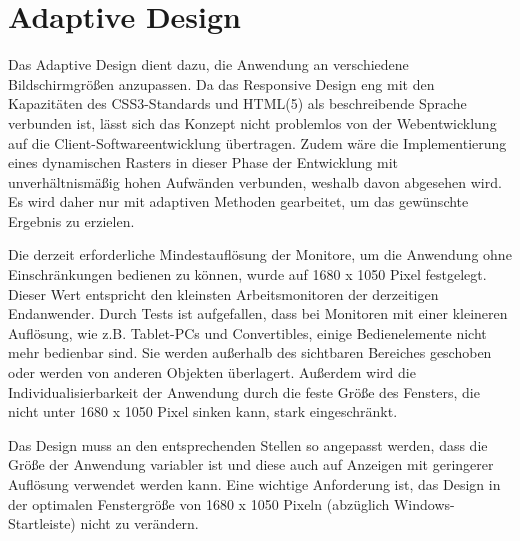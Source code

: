 \chapter{Adaptive Design}
Das Adaptive Design dient dazu, die Anwendung an verschiedene Bildschirmgrößen anzupassen. Da das Responsive Design eng mit den Kapazitäten des CSS3-Standards und HTML(5) als beschreibende Sprache verbunden ist, lässt sich das Konzept nicht problemlos von der Webentwicklung auf die Client-Softwareentwicklung übertragen. Zudem wäre die Implementierung eines dynamischen Rasters in dieser Phase der Entwicklung mit unverhältnismäßig hohen Aufwänden verbunden, weshalb davon abgesehen wird. Es wird daher nur mit adaptiven Methoden gearbeitet, um das gewünschte Ergebnis zu erzielen.\par
Die derzeit erforderliche Mindestauflösung der Monitore, um die Anwendung ohne Einschränkungen bedienen zu können, wurde auf 1680 x 1050 Pixel festgelegt. Dieser Wert entspricht den kleinsten Arbeitsmonitoren der derzeitigen Endanwender. Durch Tests ist aufgefallen, dass bei Monitoren mit einer kleineren Auflösung, wie z.B. Tablet-PCs und Convertibles, einige Bedienelemente nicht mehr bedienbar sind. Sie werden außerhalb des sichtbaren Bereiches geschoben oder werden von anderen Objekten überlagert. Außerdem wird die Individualisierbarkeit der Anwendung durch die feste Größe des Fensters, die nicht unter 1680 x 1050 Pixel sinken kann, stark eingeschränkt.\par
Das Design muss an den entsprechenden Stellen so angepasst werden, dass die Größe der Anwendung variabler ist und diese auch auf Anzeigen mit geringerer Auflösung verwendet werden kann. Eine wichtige Anforderung ist, das Design in der optimalen Fenstergröße von 1680 x 1050 Pixeln (abzüglich Windows- Startleiste) nicht zu verändern.\par
